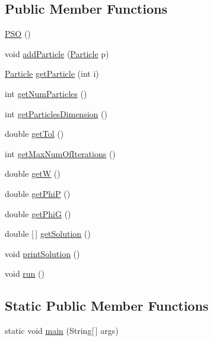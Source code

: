 \subsection*{Public Member Functions}
\begin{DoxyCompactItemize}
\item 
\hyperlink{class_p_s_o_a0aeec4970276a5e318b613e8a192064e}{P\+SO} ()
\item 
void \hyperlink{class_p_s_o_ac3676d8b4b6eb1fcb0c05a14a20af85c}{add\+Particle} (\hyperlink{class_particle}{Particle} p)
\item 
\hyperlink{class_particle}{Particle} \hyperlink{class_p_s_o_a3c697a11238d768ae2b1236d3cf6ea88}{get\+Particle} (int i)
\item 
int \hyperlink{class_p_s_o_acc2a16aac995a30f3265fa06182509af}{get\+Num\+Particles} ()
\item 
int \hyperlink{class_p_s_o_a46ddfeb9df3a42b2f1b2c4fe0d8f51b2}{get\+Particles\+Dimension} ()
\item 
double \hyperlink{class_p_s_o_a57be39727a5a7e22182c82d4274ba3ae}{get\+Tol} ()
\item 
int \hyperlink{class_p_s_o_a0d3cd48e829ba5ccb754e26f1890e51b}{get\+Max\+Num\+Of\+Iterations} ()
\item 
double \hyperlink{class_p_s_o_a50f5f8be53be944150317d590c411144}{getW} ()
\item 
double \hyperlink{class_p_s_o_a51bdbe662e545c50ac984abdba9f6448}{get\+PhiP} ()
\item 
double \hyperlink{class_p_s_o_a9ddf1bc2e611d1959fe4f6fdef960b0e}{get\+PhiG} ()
\item 
double \mbox{[}$\,$\mbox{]} \hyperlink{class_p_s_o_af3fe18f93011219d7fc3badc9220b54b}{get\+Solution} ()
\item 
void \hyperlink{class_p_s_o_a83a2cd74d2176ea147b84e17050ceffb}{print\+Solution} ()
\item 
void \hyperlink{class_p_s_o_a689d26e00d138c809a4de0a34e98cd0a}{run} ()
\end{DoxyCompactItemize}
\subsection*{Static Public Member Functions}
\begin{DoxyCompactItemize}
\item 
static void \hyperlink{class_p_s_o_a966198c3d9ecb21acf593a5e922ba843}{main} (String\mbox{[}$\,$\mbox{]} args)
\end{DoxyCompactItemize}


